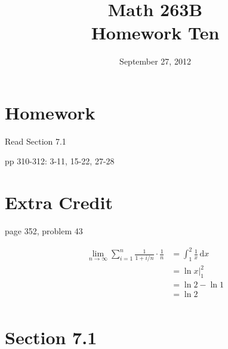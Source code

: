 \documentclass{exam}
\title{Math 263B \\ Homework Ten}
\date{September 27, 2012}
\begin{document}
\maketitle

\section{Homework}

\begin{itemize*}
  \item Read Section 7.1
  \item pp 310-312: 3-11, 15-22, 27-28
\end{itemize*}


\section{Extra Credit}
page 352, problem 43
\ifprintanswers
\begin{solution}
\begin{align*}
  \lim_{n \to \infty} \sum_{i = 1}^n \frac{1}{1 + i/n} \cdot \frac{1}{n} &= \int_1^2 \frac{1}{x} \, \mathrm{d}x \\
  &= \ln x \bigg|_1^2 \\
  &= \ln 2 - \ln 1 \\
  &= \ln 2 \\
\end{align*}
\end{solution}

\section{Section 7.1}
\end{document}
